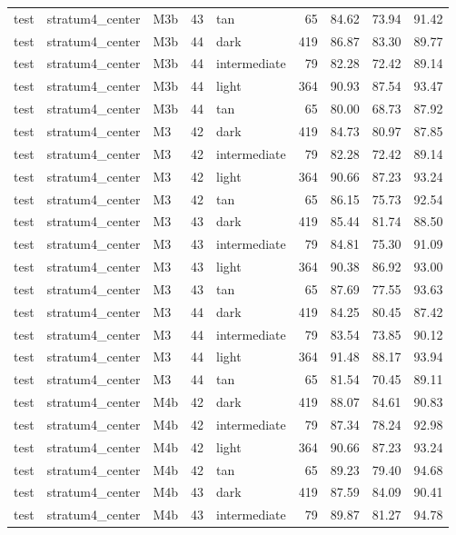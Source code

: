 \begin{tabular}{lllrlrrrr}
test & stratum4\_center & M3b & 43 & tan & 65 & 84.62 & 73.94 & 91.42 \\
test & stratum4\_center & M3b & 44 & dark & 419 & 86.87 & 83.30 & 89.77 \\
test & stratum4\_center & M3b & 44 & intermediate & 79 & 82.28 & 72.42 & 89.14 \\
test & stratum4\_center & M3b & 44 & light & 364 & 90.93 & 87.54 & 93.47 \\
test & stratum4\_center & M3b & 44 & tan & 65 & 80.00 & 68.73 & 87.92 \\
test & stratum4\_center & M3 & 42 & dark & 419 & 84.73 & 80.97 & 87.85 \\
test & stratum4\_center & M3 & 42 & intermediate & 79 & 82.28 & 72.42 & 89.14 \\
test & stratum4\_center & M3 & 42 & light & 364 & 90.66 & 87.23 & 93.24 \\
test & stratum4\_center & M3 & 42 & tan & 65 & 86.15 & 75.73 & 92.54 \\
test & stratum4\_center & M3 & 43 & dark & 419 & 85.44 & 81.74 & 88.50 \\
test & stratum4\_center & M3 & 43 & intermediate & 79 & 84.81 & 75.30 & 91.09 \\
test & stratum4\_center & M3 & 43 & light & 364 & 90.38 & 86.92 & 93.00 \\
test & stratum4\_center & M3 & 43 & tan & 65 & 87.69 & 77.55 & 93.63 \\
test & stratum4\_center & M3 & 44 & dark & 419 & 84.25 & 80.45 & 87.42 \\
test & stratum4\_center & M3 & 44 & intermediate & 79 & 83.54 & 73.85 & 90.12 \\
test & stratum4\_center & M3 & 44 & light & 364 & 91.48 & 88.17 & 93.94 \\
test & stratum4\_center & M3 & 44 & tan & 65 & 81.54 & 70.45 & 89.11 \\
test & stratum4\_center & M4b & 42 & dark & 419 & 88.07 & 84.61 & 90.83 \\
test & stratum4\_center & M4b & 42 & intermediate & 79 & 87.34 & 78.24 & 92.98 \\
test & stratum4\_center & M4b & 42 & light & 364 & 90.66 & 87.23 & 93.24 \\
test & stratum4\_center & M4b & 42 & tan & 65 & 89.23 & 79.40 & 94.68 \\
test & stratum4\_center & M4b & 43 & dark & 419 & 87.59 & 84.09 & 90.41 \\
test & stratum4\_center & M4b & 43 & intermediate & 79 & 89.87 & 81.27 & 94.78 \\

\end{tabular}
